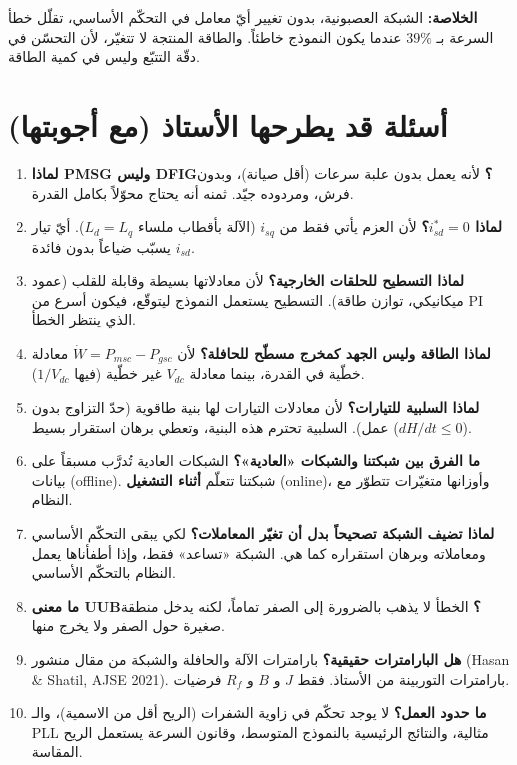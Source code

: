 \documentclass[11pt,a4paper]{article}
\newcommand{\fr}[1]{\textfrench{#1}}
\newcommand{\Khulasa}{\textbf{الخلاصة: }}
\begin{document}
\begin{khulasa}
\Khulasa
الشبكة العصبونية، بدون تغيير أيّ معامل في التحكّم الأساسي، تقلّل خطأ السرعة بـ $39\%$ عندما يكون
النموذج خاطئاً. والطاقة المنتجة لا تتغيّر، لأن التحسّن في دقّة التتبّع وليس في كمية الطاقة.
\end{khulasa}

\section{أسئلة قد يطرحها الأستاذ (مع أجوبتها)}

\begin{enumerate}
\item \textbf{لماذا \fr{PMSG} وليس \fr{DFIG}؟}
لأنه يعمل بدون علبة سرعات (أقل صيانة)، وبدون فرش، ومردوده جيّد. ثمنه أنه يحتاج محوّلاً بكامل القدرة.

\item \textbf{لماذا $i_{sd}^* = 0$؟}
لأن العزم يأتي فقط من $i_{sq}$ (الآلة بأقطاب ملساء $L_d=L_q$). أيّ تيار $i_{sd}$ يسبّب ضياعاً بدون فائدة.

\item \textbf{لماذا التسطيح للحلقات الخارجية؟}
لأن معادلاتها بسيطة وقابلة للقلب (عمود ميكانيكي، توازن طاقة). التسطيح يستعمل النموذج ليتوقّع، فيكون
أسرع من \fr{PI} الذي ينتظر الخطأ.

\item \textbf{لماذا الطاقة وليس الجهد كمخرج مسطّح للحافلة؟}
لأن $\dot W = P_{msc} - P_{gsc}$ معادلة خطّية في القدرة، بينما معادلة $V_{dc}$ غير خطّية (فيها $1/V_{dc}$).

\item \textbf{لماذا السلبية للتيارات؟}
لأن معادلات التيارات لها بنية طاقوية (حدّ التزاوج بدون عمل). السلبية تحترم هذه البنية، وتعطي برهان
استقرار بسيط ($dH/dt\le0$).

\item \textbf{ما الفرق بين شبكتنا والشبكات «العادية»؟}
الشبكات العادية تُدرَّب مسبقاً على بيانات (\fr{offline}). شبكتنا تتعلّم \textbf{أثناء التشغيل}
(\fr{online})، وأوزانها متغيّرات تتطوّر مع النظام.

\item \textbf{لماذا تضيف الشبكة تصحيحاً بدل أن تغيّر المعاملات؟}
لكي يبقى التحكّم الأساسي ومعاملاته وبرهان استقراره كما هي. الشبكة «تساعد» فقط، وإذا أطفأناها يعمل
النظام بالتحكّم الأساسي.

\item \textbf{ما معنى \fr{UUB}؟}
الخطأ لا يذهب بالضرورة إلى الصفر تماماً، لكنه يدخل منطقة صغيرة حول الصفر ولا يخرج منها.

\item \textbf{هل البارامترات حقيقية؟}
بارامترات الآلة والحافلة والشبكة من مقال منشور (\fr{Hasan \& Shatil, AJSE 2021}). بارامترات التوربينة من
الأستاذ. فقط $J$ و $B$ و $R_f$ فرضيات.

\item \textbf{ما حدود العمل؟}
لا يوجد تحكّم في زاوية الشفرات (الريح أقل من الاسمية)، والـ \fr{PLL} مثالية، والنتائج الرئيسية بالنموذج
المتوسط، وقانون السرعة يستعمل الريح المقاسة.
\end{enumerate}
\end{document}
